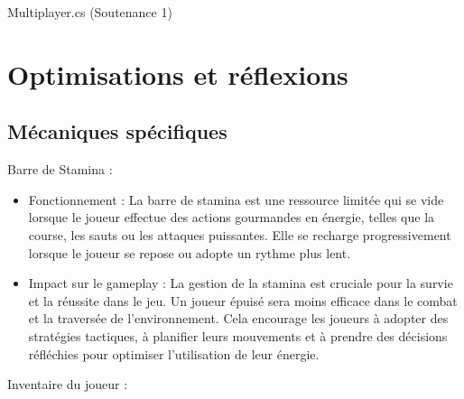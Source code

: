 \documentclass[
	article,			%
	11pt,				%
	oneside,			%
	a4paper,			%
	chapter=TITLE,
	french,			%
	sumario=tradicional
	]{base_nt}
\begin{document}
Multiplayer.cs (Soutenance 1)


\section{Optimisations et réflexions}

\subsection{Mécaniques spécifiques}

Barre de Stamina :

\begin{itemize}
    \item Fonctionnement : La barre de stamina est une ressource limitée qui se vide lorsque le joueur effectue des actions gourmandes en énergie, telles que la course, les sauts ou les attaques puissantes. Elle se recharge progressivement lorsque le joueur se repose ou adopte un rythme plus lent.
    \item Impact sur le gameplay : La gestion de la stamina est cruciale pour la survie et la réussite dans le jeu. Un joueur épuisé sera moins efficace dans le combat et la traversée de l'environnement. Cela encourage les joueurs à adopter des stratégies tactiques, à planifier leurs mouvements et à prendre des décisions réfléchies pour optimiser l'utilisation de leur énergie.
\end{itemize}

Inventaire du joueur :
\end{document}
